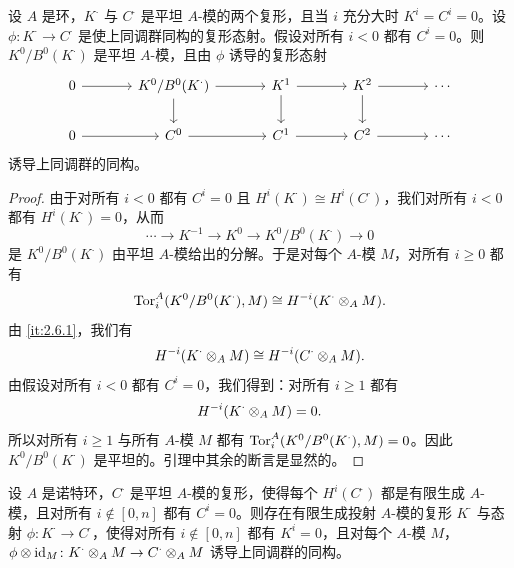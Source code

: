 \begin{lemma}\label{it:2.6.2}
设 $A$ 是环，$K^\cdot$ 与 $C^\cdot$ 是平坦 $A$-模的两个复形，且当 $i$ 充分大时 $K^i=C^i=0$。设 $\phi\colon K^\cdot\to C^\cdot$ 是使上同调群同构的复形态射。假设对所有 $i<0$ 都有 $C^i=0$。则 $K^0/B^0(K^\cdot)$ 是平坦 $A$-模，且由 $\phi$ 诱导的复形态射
\[
\begin{tikzcd}[column sep=large]
0 \arrow[r] & K^0/B^0(K^\cdot) \arrow[r] \arrow[d] & K^1 \arrow[r] \arrow[d] & K^2 \arrow[r] \arrow[d] & \cdots \\
0 \arrow[r] & C^0 \arrow[r] & C^1 \arrow[r] & C^2 \arrow[r] & \cdots
\end{tikzcd}
\]
诱导上同调群的同构。
\end{lemma}

\begin{proof}
由于对所有 $i<0$ 都有 $C^i=0$ 且 $H^i(K^\cdot)\cong H^i(C^\cdot)$，我们对所有 $i<0$ 都有 $H^i(K^\cdot)=0$，从而
\[
\cdots\to K^{-1}\to K^0\to K^0/B^0(K^\cdot)\to 0
\]
是 $K^0/B^0(K^\cdot)$ 由平坦 $A$-模给出的分解。于是对每个 $A$-模 $M$，对所有 $i\ge 0$ 都有
\[
\operatorname{Tor}_i^A(K^0/B^0(K^\cdot),M)\cong H^{-i}(K^\cdot\otimes_A M).
\]
由 \ref{it:2.6.1}，我们有
\[
H^{-i}(K^\cdot\otimes_A M)\cong H^{-i}(C^\cdot\otimes_A M).
\]
由假设对所有 $i<0$ 都有 $C^i=0$，我们得到：对所有 $i\ge 1$ 都有
\[
H^{-i}(K^\cdot\otimes_A M)=0.
\]
所以对所有 $i\ge 1$ 与所有 $A$-模 $M$ 都有 $\operatorname{Tor}_i^A(K^0/B^0(K^\cdot),M)=0$。因此 $K^0/B^0(K^\cdot)$ 是平坦的。引理中其余的断言是显然的。
\end{proof}

\begin{lemma}\label{it:2.6.3}
设 $A$ 是诺特环，$C^\cdot$ 是平坦 $A$-模的复形，使得每个 $H^i(C^\cdot)$ 都是有限生成 $A$-模，且对所有 $i\notin[0,n]$ 都有 $C^i=0$。则存在有限生成投射 $A$-模的复形 $K^\cdot$ 与态射 $\phi\colon K^\cdot\to C^\cdot$，使得对所有 $i\notin[0,n]$ 都有 $K^i=0$，且对每个 $A$-模 $M$，$\phi\otimes\operatorname{id}_M\colon K^\cdot\otimes_A M\to C^\cdot\otimes_A M$ 诱导上同调群的同构。
\end{lemma}

